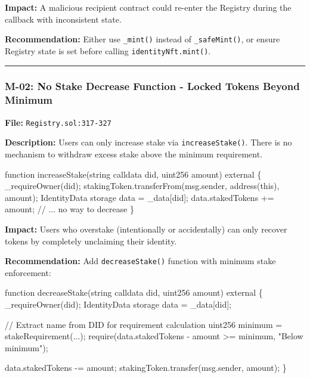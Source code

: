 \documentclass[
]{article}
\newenvironment{Shaded}{}{}
\newcommand{\NormalTok}[1]{#1}
\begin{document}
\textbf{Impact:} A malicious recipient contract could re-enter the
Registry during the callback with inconsistent state.

\textbf{Recommendation:} Either use \texttt{\_mint()} instead of
\texttt{\_safeMint()}, or ensure Registry state is set before calling
\texttt{identityNft.mint()}.

\begin{center}\rule{0.5\linewidth}{0.5pt}\end{center}

\subsubsection{M-02: No Stake Decrease Function - Locked Tokens Beyond
Minimum}\label{m-02-no-stake-decrease-function---locked-tokens-beyond-minimum}

\textbf{File:} \texttt{Registry.sol:317-327}

\textbf{Description:} Users can only increase stake via
\texttt{increaseStake()}. There is no mechanism to withdraw excess stake
above the minimum requirement.

\begin{Shaded}
\begin{Highlighting}[]
\NormalTok{function increaseStake(string calldata did, uint256 amount) external \{}
\NormalTok{    \_requireOwner(did);}
\NormalTok{    stakingToken.transferFrom(msg.sender, address(this), amount);}
\NormalTok{    IdentityData storage data = \_data[did];}
\NormalTok{    data.stakedTokens += amount;}
\NormalTok{    // ... no way to decrease}
\NormalTok{\}}
\end{Highlighting}
\end{Shaded}

\textbf{Impact:} Users who overstake (intentionally or accidentally) can
only recover tokens by completely unclaiming their identity.

\textbf{Recommendation:} Add \texttt{decreaseStake()} function with
minimum stake enforcement:

\begin{Shaded}
\begin{Highlighting}[]
\NormalTok{function decreaseStake(string calldata did, uint256 amount) external \{}
\NormalTok{    \_requireOwner(did);}
\NormalTok{    IdentityData storage data = \_data[did];}

\NormalTok{    // Extract name from DID for requirement calculation}
\NormalTok{    uint256 minimum = stakeRequirement(...);}
\NormalTok{    require(data.stakedTokens {-} amount \textgreater{}= minimum, "Below minimum");}

\NormalTok{    data.stakedTokens {-}= amount;}
\NormalTok{    stakingToken.transfer(msg.sender, amount);}
\NormalTok{\}}
\end{Highlighting}
\end{Shaded}
\end{document}
